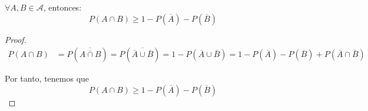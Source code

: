 \begin{prop}
    $\forall A,B \in \mathcal{A}$, entonces: $$P(A \cap B) \geq 1 - P(\overline{A}) - P(\overline{B})$$
\end{prop}
\begin{proof}
    \begin{equation*}\begin{split}
        P(A \cap B) &
        = P(\overline{\overline{A \cap B}})
        = P(\overline{\overline{A} \cup \overline{B}})
        = 1- P(\overline{A} \cup \overline{B}) 
        = 1 - P(\overline{A}) - P(\overline{B}) + P(\overline{A}
    \cap \overline{B})
    \end{split}\end{equation*}
    
    Por tanto, tenemos que
    $$P(A \cap B) \geq 1 - P(\overline{A}) - P(\overline{B})$$
\end{proof}